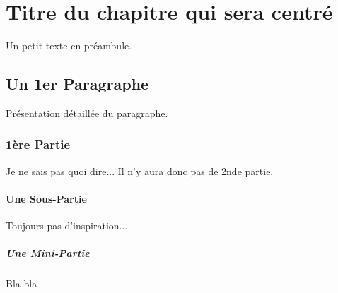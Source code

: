 \documentclass{book}
\begin{document}
\chapter{Titre du chapitre qui sera centré}

Un petit texte en préambule.


\section{Un 1er Paragraphe}

Présentation détaillée du paragraphe.


\subsection{1ère Partie}

Je ne sais pas quoi dire... Il n'y aura donc pas de 2nde partie.


\subsubsection{Une Sous-Partie}

Toujours pas d'inspiration...


\paragraph{Une Mini-Partie}

Bla bla
\end{document}

